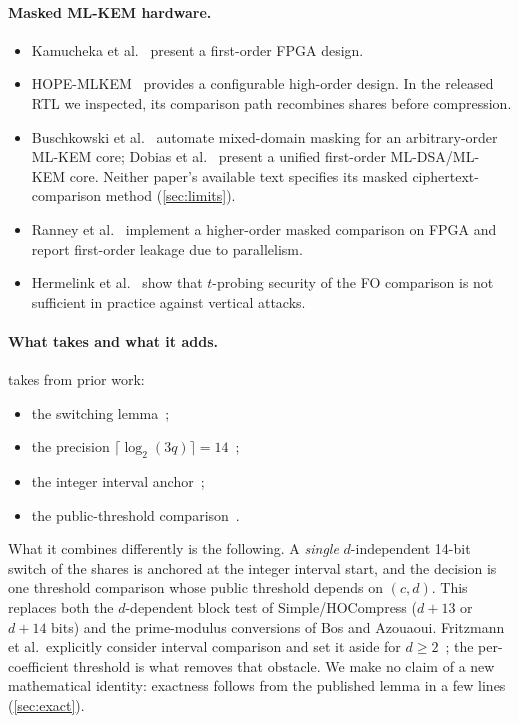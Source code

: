 \paragraph{Masked ML-KEM hardware.}
\begin{itemize}
  \item Kamucheka et al.~\cite{kamucheka2022} present a first-order FPGA design.
  \item HOPE-MLKEM~\cite{camacho2026hope} provides a configurable high-order design. In the released RTL we inspected, its comparison path recombines shares before compression.
  \item Buschkowski et al.~\cite{buschkowski2026} automate mixed-domain masking for an arbitrary-order ML-KEM core; Dobias et al.~\cite{dobias2026} present a unified first-order ML-DSA/ML-KEM core. Neither paper's available text specifies its masked ciphertext-comparison method (\cref{sec:limits}).
  \item Ranney et al.~\cite{ranney2026} implement a higher-order masked comparison on FPGA and report first-order leakage due to parallelism.
  \item Hermelink et al.~\cite{hermelink2024} show that $t$-probing security of the FO comparison is not sufficient in practice against vertical attacks.
\end{itemize}

\paragraph{What \PAMS{} takes and what it adds.}
\PAMS{} takes from prior work:
\begin{itemize}
  \item the switching lemma~\cite{coron2023dil};
  \item the precision $\lceil \log_2 (3q) \rceil = 14$~\cite{coron2023poly};
  \item the integer interval anchor~\cite{bos2021masking};
  \item the public-threshold comparison~\cite{azouaoui2023}.
\end{itemize}

What it combines differently is the following. A \emph{single} $d$-independent 14-bit switch of the shares is anchored at the integer interval start, and the decision is one threshold comparison whose public threshold depends on $(c, d)$. This replaces both the $d$-dependent block test of Simple/HOCompress ($d + 13$ or $d + 14$ bits) and the prime-modulus conversions of Bos and Azouaoui. Fritzmann et al.\ explicitly consider interval comparison and set it aside for $d \ge 2$~\cite[\S2.2.3]{fritzmann2022}; the per-coefficient threshold is what removes that obstacle. We make no claim of a new mathematical identity: exactness follows from the published lemma in a few lines (\cref{sec:exact}).

